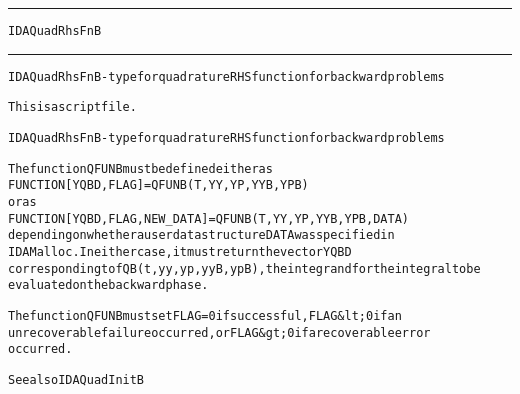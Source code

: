 \begin{samepage}
\hrule
\begin{center}
{\large \verb!IDAQuadRhsFnB!}
\label{p:IDAQuadRhsFnB}
\end{center}
\hrule\vspace{0.1in}



\begin{alltt}
IDAQuadRhsFnB - type for quadrature RHS function for backward problems
\end{alltt}

\end{samepage}



\begin{samepage}


\begin{alltt}
This is a script file. 
\end{alltt}

\end{samepage}



\begin{alltt}
IDAQuadRhsFnB - type for quadrature RHS function for backward problems

   The function QFUNB must be defined either as
        FUNCTION [YQBD, FLAG] = QFUNB(T, YY, YP, YYB, YPB)
   or as
        FUNCTION [YQBD, FLAG, NEW_DATA] = QFUNB(T, YY, YP, YYB, YPB, DATA)
   depending on whether a user data structure DATA was specified in
   IDAMalloc. In either case, it must return the vector YQBD
   corresponding to fQB(t,yy,yp,yyB,ypB), the integrand for the integral to be 
   evaluated on the backward phase.

   The function QFUNB must set FLAG=0 if successful, FLAG&lt;0 if an
   unrecoverable failure occurred, or FLAG&gt;0 if a recoverable error
   occurred.

   See also IDAQuadInitB
\end{alltt}






\vspace{0.1in}